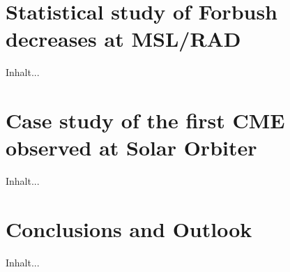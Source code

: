 \documentclass[10pt,aspectratio=169,usenames,dvipsnames]{beamer}
\begin{document}
\section{Statistical study of Forbush decreases at MSL/RAD}

\begin{frame}
    Inhalt...
\end{frame}

\section{Case study of the first CME observed at Solar Orbiter}

\begin{frame}
    Inhalt...
\end{frame}

\section{Conclusions and Outlook}

\begin{frame}
    Inhalt...
\end{frame}
\end{document}
